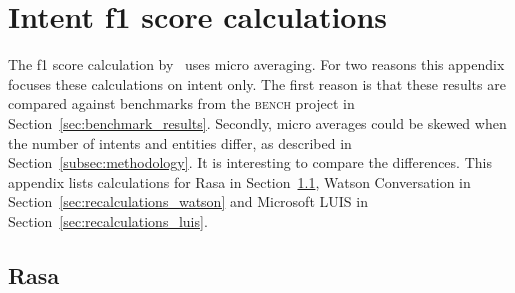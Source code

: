 \chapter{Intent f1 score calculations}
\label{ch:intent_f1_score_calculations}

The f1 score calculation by~\citep{braun2017} uses micro averaging.
For two reasons this appendix focuses these calculations on intent only.
The first reason is that these results are compared against benchmarks from the \textsc{bench} project in Section~\ref{sec:benchmark_results}.
Secondly, micro averages could be skewed when the number of intents and entities differ, as described in Section~\ref{subsec:methodology}.
It is interesting to compare the differences.
This appendix lists calculations for Rasa in Section~\ref{sec:recalculations_rasa}, Watson Conversation in Section~\ref{sec:recalculations_watson} and Microsoft LUIS in Section~\ref{sec:recalculations_luis}.

\section{Rasa}
\label{sec:recalculations_rasa}
\vspace*{1cm}


